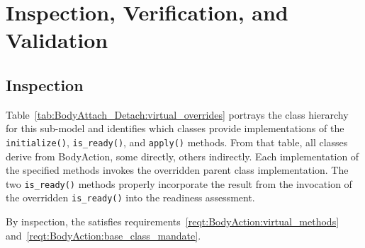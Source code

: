 %

\chapter{Inspection, Verification, and Validation}\label{ch:\modelpartid:ivv}
\section{Inspection}
\label{inspect:BodyAttach_Detach:base_class}
Table~\ref{tab:BodyAttach_Detach:virtual_overrides}
portrays the class hierarchy for this sub-model
and identifies which classes provide implementations of the
{\tt initialize()}, {\tt is\_ready()}, and {\tt apply()} methods.
From that table, all \partxname classes derive from BodyAction, some directly,
others indirectly.
Each implementation of the specified methods invokes the overridden parent class
implementation. The two {\tt is\_ready()} methods properly incorporate the result
from the invocation of the overridden {\tt is\_ready()} into the readiness
assessment.

By inspection, the \partxname satisfies
requirements~\ref{reqt:BodyAction:virtual_methods}
and~\ref{reqt:BodyAction:base_class_mandate}.

